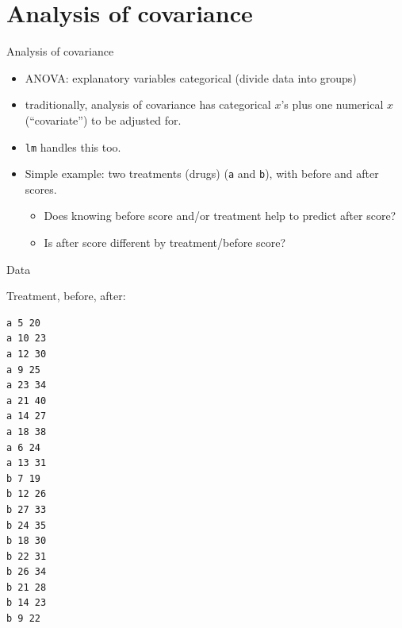 \section{Analysis of covariance}
\frame{\sectionpage}



\begin{frame}[fragile]{Analysis of covariance}

  \begin{itemize}
  \item ANOVA: explanatory variables categorical (divide data into groups)
  \item traditionally, analysis of covariance has categorical $x$'s plus one numerical $x$ (``covariate'') to be adjusted for.
  \item \texttt{lm} handles this too.
  \item Simple example: two treatments (drugs) (\verb-a- and \verb-b-), with before and after scores. 
    \begin{itemize}
    \item 
Does knowing before score and/or treatment help to predict after score?
\item Is after score different by treatment/before score?
    \end{itemize}
  \end{itemize}

\end{frame}

\begin{frame}[fragile]{Data}

Treatment, before, after:

\begin{multicols}{2}

\begin{verbatim}
a 5 20
a 10 23
a 12 30
a 9 25
a 23 34
a 21 40
a 14 27
a 18 38
a 6 24
a 13 31
b 7 19
b 12 26
b 27 33
b 24 35
b 18 30
b 22 31
b 26 34
b 21 28
b 14 23
b 9 22
\end{verbatim}

  
\end{multicols}

\end{frame}


